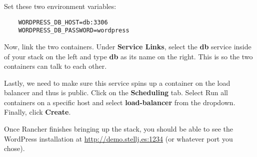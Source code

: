 Set these two environment variables:

\begin{verbatim}
    WORDPRESS_DB_HOST=db:3306
    WORDPRESS_DB_PASSWORD=wordpress
\end{verbatim}

Now, link the two containers. Under \textbf{Service Links}, select the \textbf{db} service inside of your stack on the left and type \textbf{db} as its name on the right. This is so the two containers can talk to each other.

Lastly, we need to make sure this service spins up a container on the load balancer and thus is public. Click on the \textbf{Scheduling} tab. Select {Run all containers on a specific host} and select \textbf{load-balancer} from the dropdown. Finally, click \textbf{Create}.

Once Rancher finishes bringing up the stack, you should be able to see the WordPress installation at \url{http://demo.stellj.es:1234} (or whatever port you chose).
